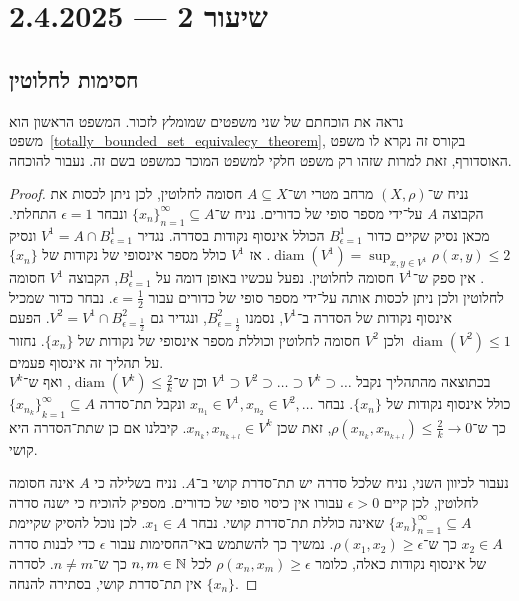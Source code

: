 \section{שיעור 2 --- 2.4.2025}
\subsection{חסימות לחלוטין}
נראה את הוכחתם של שני משפטים שמומלץ לזכור.
המשפט הראשון הוא משפט\ \ref{totally_bounded_set_equivalecy_theorem}, בקורס זה נקרא לו משפט האוסדורף, זאת למרות שזהו רק משפט חלקי למשפט המוכר כמשפט בשם זה.
נעבור להוכחה.
\begin{proof}
	נניח ש־$(X, \rho)$ מרחב מטרי וש־$A \subseteq X$ חסומה לחלוטין, לכן ניתן לכסות את הקבוצה $A$ על־ידי מספר סופי של כדורים.
	נניח ש־${\{ x_n \}}_{n = 1}^\infty \subseteq A$ ונבחר $\epsilon = 1$ התחלתי.
	מכאן נסיק שקיים כדור $B_{\epsilon = 1}^1$ הכולל אינסוף נקודות בסדרה.
	נגדיר $V^1 = A \cap B_{\epsilon = 1}^1$ ונסיק $\operatorname{diam}(V^1) = \sup_{x, y \in V^1} \rho(x, y) \le 2$.
	אז $V^1$ כולל מספר אינסופי של נקודות של $\{ x_n \}$.
	אין ספק ש־$V^1$ חסומה לחלוטין.
	נפעל עכשיו באופן דומה על $B_{\epsilon = 1}^1$, הקבוצה $V^1$ חסומה לחלוטין ולכן ניתן לכסות אותה על־ידי מספר סופי של כדורים עבור $\epsilon = \frac{1}{2}$.
	נבחר כדור שמכיל אינסוף נקודות של הסדרה ב־$V^1$, נסמנו $B_{\epsilon = \frac{1}{2}}^2$, ונגדיר גם $V^2 = V^1 \cap B_{\epsilon = \frac{1}{2}}^2$.
	הפעם $\operatorname{diam}(V^2) \le 1$ ולכן $V^2$ חסומה לחלוטין וכוללת מספר אינסופי של נקודות של $\{ x_n \}$.
	נחזור על תהליך זה אינסוף פעמים. \\
	בכתוצאה מהתהליך נקבל $V^1 \supset V^2 \supset \dots \supset V^k \supset \dots$ וכן ש־$\operatorname{diam}(V^k) \le \frac{2}{k}$,
	ואף ש־$V^k$ כולל אינסוף נקודות של $\{ x_n \}$.
	נבחר $x_{n_1} \in V^1, x_{n_2} \in V^2, \dots$ ונקבל תת־סדרה ${\{ x_{n_k} \}}_{k = 1}^\infty \subseteq A$ כך ש־$\rho(x_{n_k}, x_{n_{k + l}}) \le \frac{2}{k} \to 0$, זאת שכן $x_{n_k}, x_{n_{k + l}} \in V^k$.
	קיבלנו אם כן שתת־הסדרה היא קושי.

	נעבור לכיוון השני, נניח שלכל סדרה יש תת־סדרת קושי ב־$A$.
	נניח בשלילה כי $A$ אינה חסומה לחלוטין, לכן קיים $\epsilon > 0$ עבורו אין כיסוי סופי של כדורים.
	מספיק להוכיח כי ישנה סדרה ${\{ x_n \}}_{n = 1}^\infty \subseteq A$ שאינה כוללת תת־סדרת קושי.
	נבחר $x_1 \in A$.
	לכן נוכל להסיק שקיימת $x_2 \in A$ כך ש־$\rho(x_1, x_2) \ge \epsilon$.
	נמשיך כך להשתמש באי־החסימות עבור $\epsilon$ כדי לבנות סדרה של אינסוף נקודות כאלה, כלומר $\rho(x_n, x_m) \ge \epsilon$ לכל $n, m \in \mathbb{N}$ כך ש־$n \ne m$.
	לסדרה $\{ x_n \}$ אין תת־סדרת קושי, בסתירה להנחה.
\end{proof}

